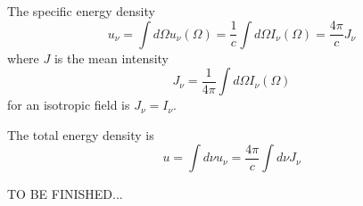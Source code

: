 The specific energy density
%
\[
u_\nu = \int d\Omega u_\nu(\Omega) = \frac{1}{c} \int d\Omega I_\nu(\Omega) = \frac{4\pi}{c} J_\nu
\]
%
where $J$ is the mean intensity
%
\[
J_\nu = \frac{1}{4\pi}\int d\Omega I_\nu(\Omega) 
\]
%
for an isotropic field is $J_\nu = I_\nu$.

The total energy density is
%
\[
u = \int d\nu u_\nu = \frac{4\pi}{c} \int d\nu J_\nu
\]

{\color{red}TO BE FINISHED...}

%
%
%
%
%
%
%
%
%
%
%
%
%
%
%
%
%
%
%
